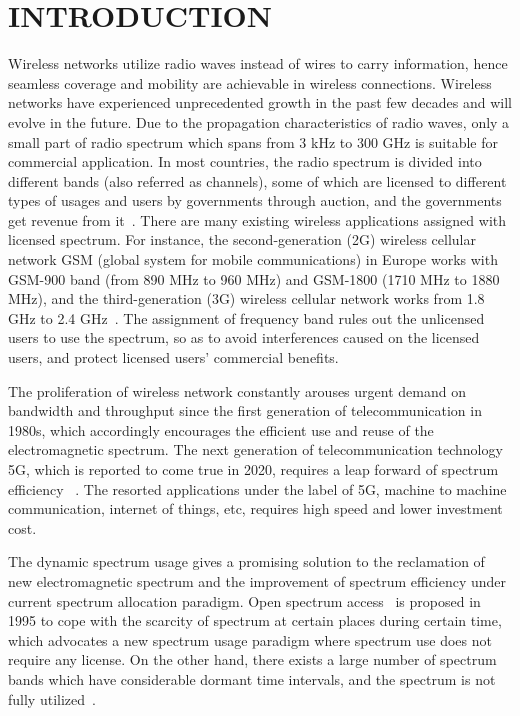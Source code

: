 \chapter{INTRODUCTION}
Wireless networks utilize radio waves instead of wires to carry information, hence seamless coverage and mobility are achievable in wireless connections.
Wireless networks have experienced unprecedented growth in the past few decades and will evolve in the future.
Due to the propagation characteristics of radio waves, only a small part of radio spectrum which spans from 3 kHz to 300 GHz
is suitable for commercial application.
In most countries, the radio spectrum is divided into different bands (also referred as channels), some of which are licensed to different types of usages and users by governments through auction, and the governments get revenue from it~\cite{Spectrum_Management07}.
There are many existing wireless applications assigned with licensed spectrum.
For instance, the second-generation (2G) wireless cellular network GSM (global system for mobile communications) in Europe works with GSM-900 band (from 890 MHz to 960 MHz) and GSM-1800 (1710 MHz to 1880 MHz), and the third-generation (3G) wireless cellular network works from 1.8 GHz to 2.4 GHz~\cite{wireless_communicatioins2001}.
The assignment of frequency band rules out the unlicensed users to use the spectrum, so as to avoid interferences caused on the licensed users, and protect licensed users' commercial benefits.

The proliferation of wireless network constantly arouses urgent demand on bandwidth and throughput since the first generation of telecommunication in 1980s, which accordingly encourages the efficient use and reuse of the electromagnetic spectrum.
The next generation of telecommunication technology 5G, which is reported to come true in 2020, requires a leap forward of spectrum efficiency ~\cite{5G_2014}.
The resorted applications under the label of 5G, \ie machine to machine communication, internet of things, etc, requires high speed and lower investment cost.
								
The dynamic spectrum usage gives a promising solution to the reclamation of new electromagnetic spectrum and the improvement of spectrum efficiency under current spectrum allocation paradigm.
Open spectrum access~\cite{osa_Noam_1995} is proposed in 1995 to cope with the scarcity of spectrum at certain places during certain time, which advocates a new spectrum usage paradigm where spectrum use does not require any license.
On the other hand, there exists a large number of spectrum bands which have considerable dormant time intervals, and the spectrum is not fully utilized~\cite{Akyildiz06survey}.


